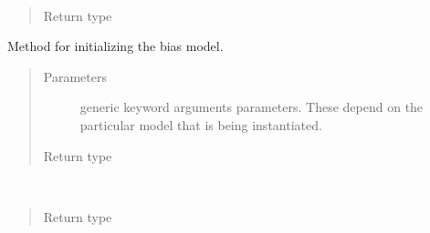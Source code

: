 \documentclass[letterpaper,10pt,english]{sphinxmanual}
\begin{document}
\begin{fulllineitems}
\begin{fulllineitems}
\label{\detokenize{api/seyfert.cosmology.bias.Bias:seyfert.cosmology.bias.Bias.fromHDF5}}~\begin{quote}\begin{description}
\item[{Return type}] \leavevmode
\sphinxAtStartPar
{\hyperref[\detokenize{api/seyfert.cosmology.bias.Bias:seyfert.cosmology.bias.Bias}]{}}

\end{description}\end{quote}

\end{fulllineitems}


\begin{fulllineitems}
\label{\detokenize{api/seyfert.cosmology.bias.Bias:seyfert.cosmology.bias.Bias.initBiasModel}}
\sphinxAtStartPar
Method for initializing the bias model.
\begin{quote}\begin{description}
\item[{Parameters}] \leavevmode
\sphinxAtStartPar
{} \textendash{} generic keyword arguments parameters. These depend on the particular model that is being
instantiated.

\item[{Return type}] \leavevmode
\sphinxAtStartPar
{}

\end{description}\end{quote}

\end{fulllineitems}


\begin{fulllineitems}
\label{\detokenize{api/seyfert.cosmology.bias.Bias:seyfert.cosmology.bias.Bias.loadFromHDF5}}~\begin{quote}\begin{description}
\item[{Return type}] \leavevmode
\sphinxAtStartPar
{}


\end{description}
\end{quote}
\end{fulllineitems}
\end{fulllineitems}
\end{document}
